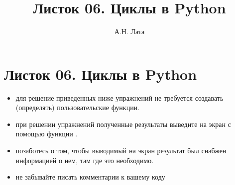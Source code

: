 \documentclass[a4,12pt]{article}
\title{Листок 06. Циклы в Python}
\author{А.Н. Лата}
\theoremstyle{remark}
\begin{document}
 


\section*{\centering Листок 06. Циклы в Python}

\begin{exercisenote}[title=Замечания]
\begin{itemize}
    \item для решение приведенных ниже упражнений не требуется создавать (определять) пользовательские функции.
    \item при решении упражнений полученные результаты выведите на экран с помощью функции {\color{blue}{print()}}.
    \item позаботесь о том, чтобы выводимый на экран результат был снабжен информацией о нем, там где это необходимо.
    \item не забывайте писать комментарии к вашему коду
\end{itemize}
\end{exercisenote}

\end{document}
